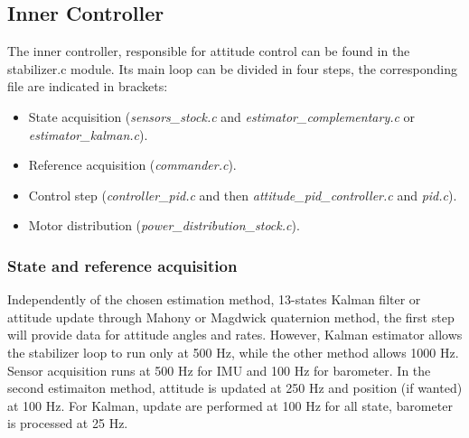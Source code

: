 \documentclass[a4paper, 12pt]{report}
\begin{document}
\subsection{Inner Controller}
\label{sec:innerControl}
The inner controller, responsible for attitude control can be found in the stabilizer.c module. Its main loop can be divided in four steps, the corresponding file are indicated in brackets:
\begin{itemize}
\item State acquisition (\emph{sensors\_stock.c} and \emph{estimator\_complementary.c}  or \emph{estimator\_kalman.c}).
\item Reference acquisition (\emph{commander.c}).
\item Control step (\emph{controller\_pid.c} and then \emph{attitude\_pid\_controller.c} and \emph{pid.c}).
\item Motor distribution (\emph{power\_distribution\_stock.c}).
\end{itemize}

\subsubsection{State and reference acquisition}
Independently of the chosen estimation method, 13-states Kalman filter or attitude update through Mahony or Magdwick quaternion method, the first step will provide data for attitude angles and rates. However, Kalman estimator allows the stabilizer loop to run only at 500 Hz, while the other method allows 1000 Hz. Sensor acquisition runs at 500 Hz for IMU and 100 Hz for barometer. In the second estimaiton method, attitude is updated at 250 Hz and position (if wanted) at 100 Hz. For Kalman, update are performed at 100 Hz for all state, barometer is processed at 25 Hz.
\end{document}

